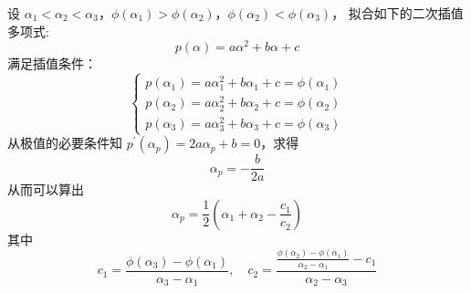\documentclass[cn]{elegantbook}
\begin{document}
设 $\alpha_{1}<\alpha_{2}<\alpha_{3}$，$\phi\left(\alpha_{1}\right)>\phi\left(\alpha_{2}\right)$，$\phi\left(\alpha_{2}\right)<\phi\left(\alpha_{3}\right)$， 拟合如下的二次插值多项式:
\begin{equation}
    p(\alpha)=a\alpha^{2}+b\alpha+c
\end{equation}
满足插值条件：
\begin{equation}
    \left\{\begin{array}{l}
        p\left(\alpha_{1}\right)=a\alpha_{1}^{2}+b\alpha_{1}+c=\phi\left(\alpha_{1}\right) \\
        p\left(\alpha_{2}\right)=a\alpha_{2}^{2}+b\alpha_{2}+c=\phi\left(\alpha_{2}\right) \\
        p\left(\alpha_{3}\right)=a\alpha_{3}^{2}+b\alpha_{3}+c=\phi\left(\alpha_{3}\right)
    \end{array}\right.
\end{equation}
从极值的必要条件知 $p^{\prime}(\alpha_{p})=2a\alpha_{p}+b=0$，求得
\begin{equation}
    \alpha_{p}=-\frac{b}{2a}
\end{equation}
从而可以算出
\begin{equation}
    \alpha_{p}=\frac{1}{2}\left(\alpha_{1}+\alpha_{2}-\frac{c_{1}}{c_{2}}\right)
\end{equation}
其中
\begin{equation}
    c_{1}=\frac{\phi\left(\alpha_{3}\right)-\phi\left(\alpha_{1}\right)}{\alpha_{3}-\alpha_{1}},\quad c_{2}=\frac{\frac{\phi\left(\alpha_{2}\right)-\phi\left(\alpha_{1}\right)}{\alpha_{2}-\alpha_{1}}-c_{1}}{\alpha_{2}-\alpha_{3}}
\end{equation}
\end{document}
